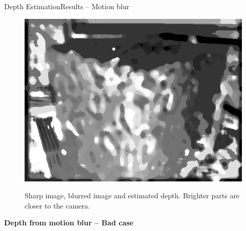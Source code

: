 \documentclass{beamer}
\begin{document}
\begin{frame}{Depth Estimation}{Results -- Motion blur}
\begin{figure}[H]
\begin{center}
\resizebox{30mm}{!} {\includegraphics {../images/depth/eg1/imdepth.png}}
\caption{\scriptsize{Sharp image, blurred image and estimated depth. Brighter parts are closer to the camera.}}
\end{center}
\end{figure}
\vspace{-0.1cm}
\textbf{Depth from motion blur -- Bad case}


\end{frame}
\end{document}
